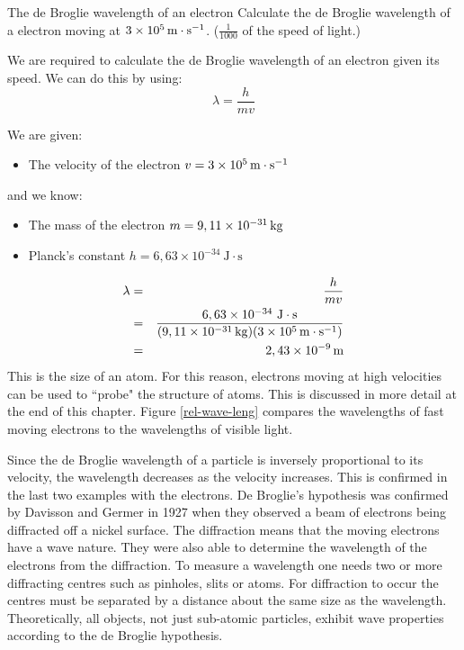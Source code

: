 \begin{wex}{The de Broglie wavelength of an electron}
{Calculate the de Broglie wavelength of a electron moving at $3 \times 10^{5}\,\mathrm{m \cdot s^{-1}}$. ($\frac{1}{1000}$ of the speed of light.)}

{
We are required to calculate the de Broglie wavelength of an electron given its speed. We can do this by using:
$$\lambda=\frac{h}{mv}$$

We are given:
\begin{itemize}
\item The velocity of the electron {$v=3 \times 10^{5}\,\mathrm{m \cdot s^{-1}}$}
\end{itemize}
and we know:
\begin{itemize}
\item The mass of the electron {$m=9,11 \times 10^{-31}\,\mathrm{kg}$}
\item Planck's constant {$h=6,63\times10^{-34}~\mathrm{J\cdot s}$}
\end{itemize}

\begin{eqnarray*}
\lambda&=&\frac{h}{mv}\\
&=&\frac{6,63\times10^{-34}~\mathrm{J\cdot s}}{(9,11 \times 10^{-31}\,\mathrm{kg})(3 \times 10^{5}\,\mathrm{m \cdot s^{-1}})}\\
& = & 2,43 \times 10^{-9}\,\rm{m}
\end{eqnarray*}
This is the size of an atom. For this reason, electrons moving at high velocities can be used to ``probe" the structure of atoms. This is discussed in more detail at the end of this chapter.  Figure \ref{rel-wave-leng} compares the wavelengths of fast moving electrons to the wavelengths of visible light.}
\end{wex}

Since the de Broglie wavelength of a particle is inversely proportional to its velocity, the wavelength decreases as the velocity increases. This is confirmed in the last two examples with the electrons. 
De Broglie's hypothesis was confirmed by Davisson and Germer in 1927 when they observed a beam of electrons being diffracted off a nickel surface. The diffraction means that the moving electrons have a wave nature. They were also able to determine the wavelength of the electrons from the diffraction. To measure a wavelength one needs two or more diffracting centres such as pinholes, slits or atoms. For diffraction to occur the centres must be separated by a distance about the same size as the wavelength. Theoretically, all objects, not just sub-atomic particles, exhibit wave properties according to the de Broglie hypothesis.


